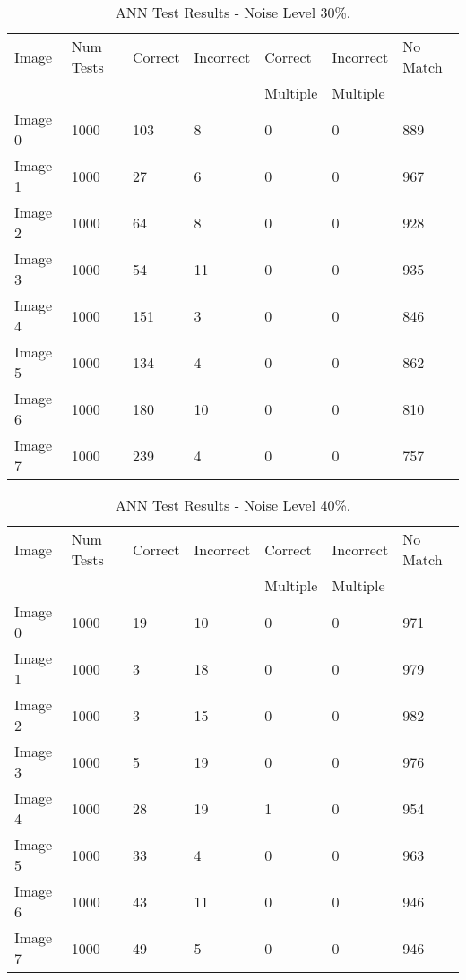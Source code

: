 \begin{table}[tbh]
\caption{ANN Test Results - Noise Level 30\%. \label{table:ann30}}
\begin{center}
\begin{tabular}{|l|l|l|l|l|l|l|}
  \hline
  Image & Num Tests & Correct & Incorrect & Correct & Incorrect & No Match \\
  &&&&Multiple&Multiple&\\
 \hline
  Image 0 & 1000 & 103 & 8 & 0 & 0 & 889\\
\hline
  Image 1 & 1000 & 27 & 6 & 0 & 0 & 967\\ 
\hline
  Image 2 & 1000 & 64 & 8 & 0 & 0 & 928 \\
\hline
  Image 3 & 1000 & 54 & 11 & 0 & 0 & 935\\
\hline
  Image 4 &1000 & 151 & 3 & 0 & 0 & 846\\
\hline
  Image 5 &1000 & 134 & 4 & 0 & 0 & 862 \\
\hline
  Image 6 & 1000 & 180 & 10 & 0 & 0 & 810\\
\hline
  Image 7 & 1000 & 239 & 4 & 0 & 0 & 757\\
  \hline
\end{tabular}
\end{center}
\end{table}

\begin{table}[tbh]
\caption{ANN Test Results - Noise Level 40\%. \label{table:ann40}}
\begin{center}
\begin{tabular}{|l|l|l|l|l|l|l|}
  \hline
  Image & Num Tests & Correct & Incorrect & Correct & Incorrect & No Match \\
  &&&&Multiple&Multiple&\\
 \hline
  Image 0 & 1000 & 19 & 10 & 0 & 0 & 971\\
\hline
  Image 1 & 1000 & 3 & 18 & 0 & 0 & 979 \\ 
\hline
  Image 2 & 1000 & 3 & 15 & 0 & 0 & 982 \\
\hline
  Image 3 & 1000 & 5 & 19 & 0 & 0 & 976\\
\hline
  Image 4 &1000 & 28 & 19 & 1 & 0 & 954 \\
\hline
  Image 5 &1000 & 33 & 4 & 0 & 0 & 963 \\
\hline
  Image 6 & 1000 & 43 & 11 & 0 & 0 & 946\\
\hline
  Image 7 & 1000 & 49 & 5 & 0 & 0 & 946\\
  \hline
\end{tabular}
\end{center}
\end{table}

